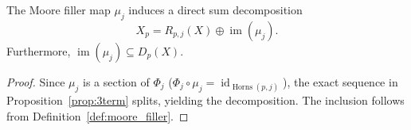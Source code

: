 \begin{corollary}\label{cor:horn_decomp_general}
The Moore filler map $\mu_j$ induces a direct sum decomposition
\[
X_p = R_{p,j}(X) \oplus \operatorname{im}(\mu_j).
\]
Furthermore, $\operatorname{im}(\mu_j) \subseteq D_p(X)$.
\end{corollary}


\begin{proof}
Since $\mu_j$ is a section of $\Phi_j$ ($\Phi_j \circ \mu_j = \operatorname{id}_{\operatorname{Horns}(p,j)}$), the exact sequence in Proposition~\ref{prop:3term} splits, yielding the decomposition.
The inclusion follows from Definition~\ref{def:moore_filler}.
\end{proof}
